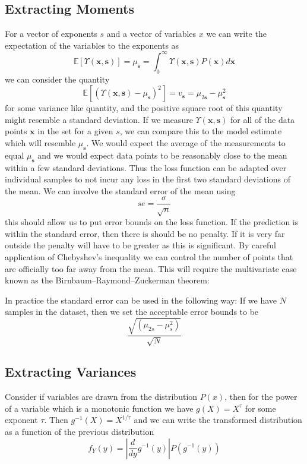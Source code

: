 \documentclass[journal=jcisd8,manuscript=article,layout=onecolumn,pdftex,floatfix,amsmath,amssymb,10pt]{achemso}
\begin{document}
\subsection{Extracting Moments}
For a vector of exponents $s$ and a vector of variables $x$ we can write the expectation of the variables to the exponents as \begin{equation}
\mathbb{E}[\Upsilon(\mathbf{x},\mathbf{s})] = \mu_{\mathbf{s}} = \int_0^\infty \Upsilon(\mathbf{x},\mathbf{s})P(\mathbf{x})d\mathbf{x}
\end{equation}
we can consider the quantity \begin{equation}
\mathbb{E}[(\Upsilon(\mathbf{x},\mathbf{s}) - \mu_{\mathbf{s}})^2] = v_{\mathbf{s}} = \mu_{2\mathbf{s}} - \mu_{\mathbf{s}}^2
\end{equation}
for some variance like quantity, and the positive square root of this quantity might resemble a standard deviation. If we measure $\Upsilon(\mathbf{x},\mathbf{s})$ for all of the data points $\mathbf{x}$ in the set for a given $s$, we can compare this to the model estimate  which will resemble $\mu_{\mathbf{s}}$. We would expect the average of the measurements to equal $\mu_{\mathbf{s}}$ and we would expect data points to be reasonably close to the mean within a few standard deviations. Thus the loss function can be adapted over individual samples to not incur any loss in the first two standard deviations of the mean. We can involve the standard error of the mean using \begin{equation}
se = \frac{\sigma}{\sqrt{n}}
\end{equation}
this should allow us to put error bounds on the loss function. If the prediction is within the standard error, then there is should be no penalty. If it is very far outside the penalty will have to be greater as this is significant. By careful application of Chebyshev's inequality we can control the number of points that are officially too far away from the mean. This will require the multivariate case known as the Birnbaum–Raymond–Zuckerman theorem:

In practice the standard error can be used in the following way: If we have $N$ samples in the dataset, then we set the acceptable error bounds to be \begin{equation}
\frac{\sqrt{(\mu_{2s} - \mu_{s}^2)}}{\sqrt{N}}
\end{equation}


\subsection{Extracting Variances}
Consider if variables are drawn from the distribution $P(x)$, then for the power of a variable which is a monotonic function we have $g(X)=X^\tau$ for some exponent $\tau$. Then $g^{-1}(X)=X^{1/\tau}$ and we can write the transformed distribution as a function of the previous distribution 
\begin{equation}
f_Y(y) = \left | \frac{d}{dy} g^{-1}(y) \right | P(g^{-1}(y))
\end{equation}
\end{document}
